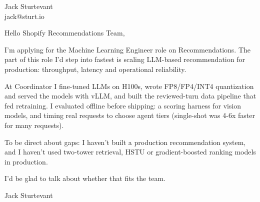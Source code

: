 \documentclass[11pt]{article}
\begin{document}
\raggedright

{\namefont\fontsize{20pt}{24pt}\selectfont Jack Sturtevant}\\[-0.3em]
jack@sturt.io

\vspace{1.2em}

Hello Shopify Recommendations Team,

I'm applying for the Machine Learning Engineer role on Recommendations. The part of this role I'd step into fastest is scaling LLM-based recommendation for production: throughput, latency and operational reliability.

At Coordinator I fine-tuned LLMs on H100s, wrote FP8/FP4/INT4 quantization and served the models with vLLM, and built the reviewed-turn data pipeline that fed retraining. I evaluated offline before shipping: a scoring harness for vision models, and timing real requests to choose agent tiers (single-shot was 4-6x faster for many requests).

To be direct about gaps: I haven't built a production recommendation system, and I haven't used two-tower retrieval, HSTU or gradient-boosted ranking models in production.

I'd be glad to talk about whether that fits the team.

\vspace{0.6em}
Jack Sturtevant
\end{document}
